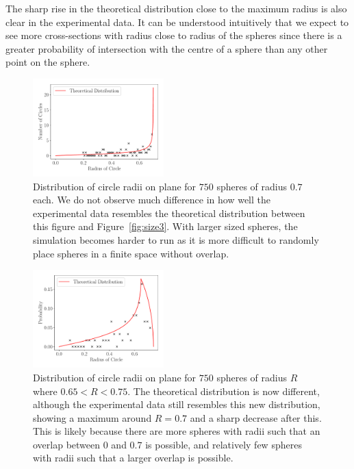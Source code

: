 \documentclass[journal]{IEEEtran}
\begin{document}
The sharp rise in the theoretical distribution close to the maximum radius is
also clear in the experimental data. It can be understood intuitively that we
expect to see more cross-sections with radius close to radius of the spheres
since there is a greater probability of intersection with the centre of a sphere
than any other point on the sphere.

\begin{figure}%
\begin{center}
\includegraphics[width=0.45\textwidth]{images/750_07.pdf}
\caption{Distribution of circle radii on plane for $750$ spheres of radius $0.7$
  each. We do not observe much difference in how well the experimental data
  resembles the theoretical distribution between this figure and
  Figure~\ref{fig:size3}. With larger sized spheres, the simulation becomes harder
  to run as it is more difficult to randomly place spheres in a finite space
  without overlap.}\label{fig:size7}
\end{center}
\end{figure}

\begin{figure}[H]%
\begin{center}
\includegraphics[width=0.45\textwidth]{images/750_07_random.pdf}
\caption{Distribution of circle radii on plane for $750$ spheres of radius $R$
  where $0.65 < R < 0.75$. The theoretical distribution is now different,
  although the experimental data still resembles this new distribution, showing
  a maximum around $R = 0.7$ and a sharp decrease after this. This is likely
  because there are more spheres with radii such that an overlap between $0$ and
  $0.7$ is possible, and relatively few spheres with radii such that a larger
  overlap is possible.}
\label{fig:random}
\end{center}
\end{figure}
\end{document}
